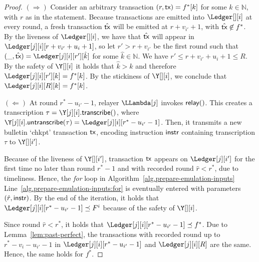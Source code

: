 \begin{proof}
  \noindent
  \textbf{$(\Longrightarrow)$} Consider an arbitrary transaction $(r, \textsf{tx}) = f^*[k]$
  for some $k \in \mathbb{N}$, with $r$ as in the statement.
  Because transactions are emitted into $\Ledger[][i]$
  at every round, a fresh transaction $\hat{\textsf{tx}}$ will be emitted at $r + v_{i'} + 1$,
  with $\hat{\textsf{tx}} \not\in f^*$.
  By the liveness of $\Ledger[][i]$, we have that $\hat{\textsf{tx}}$ will appear in
  $\Ledger[j][i][r + v_{i'} + u_i + 1]$, so let $r' > r + v_{i'}$ be the first round such that
  $(\_, \hat{\tx}) = \Ledger[j][i][r'][\hat{k}]$
  for some $\hat{k} \in \mathbb{N}$.
  We have $r' \leq r + v_{i'} + u_i + 1 \leq R$.
  By the safety of $\Y[][i]$ it holds that $\hat{k} > k$
  and therefore $\Ledger[j][i][r'][k] = f^*[k]$.
  By the stickiness of $\Y[][i]$, we conclude that
  $\Ledger[j][i][R][k] = f^*[k]$.

  \noindent
  \textbf{$(\Longleftarrow)$}
  At round $r^* - u_{i'} - 1$, relayer $\LLambda[j]$ invokes $\textsf{relay}()$.
  This creates a transcription $\tau = \Y[j][i].\transcribe()$, where
  $\Y[j][i].\untranscribe(\tau) = \Ledger[j][i][r^* - u_{i'} - 1]$.
  Then, it transmits a new bulletin `chkpt' transaction $\textsf{tx}$,
  encoding instruction $\textsf{instr}$ containing transcription $\tau$ to $\Y[][i']$.

  Because of the liveness of $\Y[][i']$, transaction $\textsf{tx}$ appears on $\Ledger[j][i']$ for the
  first time no later than round $r^* - 1$ and with recorded round $\hat{r} < r^*$, due to timeliness.
  Hence, the \emph{for} loop in Algorithm~\ref{alg.prepare-emulation-inputs}
  Line~\ref{alg.prepare-emulation-inputs:for} is eventually entered with
  parameters $(\hat{r}, \textsf{instr})$. By the end of the iteration, it holds that
  $\Ledger[j][i][r^* - u_{i'} - 1] \preceq F^i$ because of the safety of $\Y[][i]$.

  Since round $\hat{r} < r^*$, it holds that $\Ledger[j][i][r^* - u_{i'} - 1] \preceq f^*$.
  Due to Lemma~\ref{lem:past-perfect}, the transactions
  with recorded round up to $r^* - v_i - u_{i'} - 1$ in $\Ledger[j][i][r^* - u_{i'} - 1]$
  and $\Ledger[j][i][R]$ are the same.
  Hence, the same holds for $f^*$.\Qed
\end{proof}
\fi


